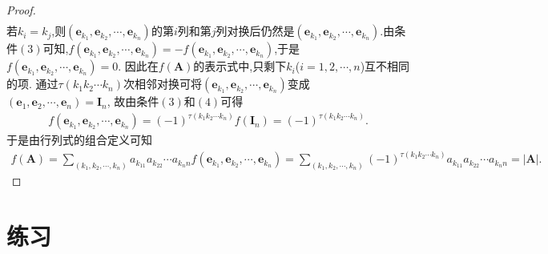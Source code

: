 \documentclass[lang=cn,newtx,10pt,scheme=chinese]{elegantbook}
\begin{document}
\begin{proof}
\begin{align*}
    \end{align*}
    若\(k_i = k_j\),则\((\boldsymbol{e}_{k_1},\boldsymbol{e}_{k_2},\cdots,\boldsymbol{e}_{k_n})\)的第\(i\)列和第\(j\)列对换后仍然是\((\boldsymbol{e}_{k_1},\boldsymbol{e}_{k_2},\cdots,\boldsymbol{e}_{k_n})\).由条件\((3)\)可知,\(f(\boldsymbol{e}_{k_1},\boldsymbol{e}_{k_2},\cdots,\boldsymbol{e}_{k_n}) = -f(\boldsymbol{e}_{k_1},\boldsymbol{e}_{k_2},\cdots,\boldsymbol{e}_{k_n})\),于是\(f(\boldsymbol{e}_{k_1},\boldsymbol{e}_{k_2},\cdots,\boldsymbol{e}_{k_n}) = 0\).
    因此在\(f(\boldsymbol{A})\)的表示式中,只剩下\(k_i\)(\(i = 1,2,\cdots,n\))互不相同的项.
    通过\(\tau(k_1k_2\cdots k_n)\)次相邻对换可将\((\boldsymbol{e}_{k_1},\boldsymbol{e}_{k_2},\cdots,\boldsymbol{e}_{k_n})\)变成\((\boldsymbol{e}_1,\boldsymbol{e}_2,\cdots,\boldsymbol{e}_n) = \boldsymbol{I}_n\),
    故由条件\((3)\)和\((4)\)可得
    \begin{align*}
        f(\boldsymbol{e}_{k_1},\boldsymbol{e}_{k_2},\cdots,\boldsymbol{e}_{k_n}) = (-1)^{\tau(k_1k_2\cdots k_n)}f(\boldsymbol{I}_n) = (-1)^{\tau(k_1k_2\cdots k_n)}.
    \end{align*}
    于是由行列式的组合定义可知
    \begin{align*}
       f(\boldsymbol{A}) = \sum_{(k_1,k_2,\cdots,k_n)}a_{k_11}a_{k_22}\cdots a_{k_nn}f(\boldsymbol{e}_{k_1},\boldsymbol{e}_{k_2},\cdots,\boldsymbol{e}_{k_n}) = \sum_{(k_1,k_2,\cdots,k_n)}(-1)^{\tau(k_1k_2\cdots k_n)}a_{k_11}a_{k_22}\cdots a_{k_nn} = |\boldsymbol{A}|.
    \end{align*}
\end{proof}

\section{练习}
\end{document}
